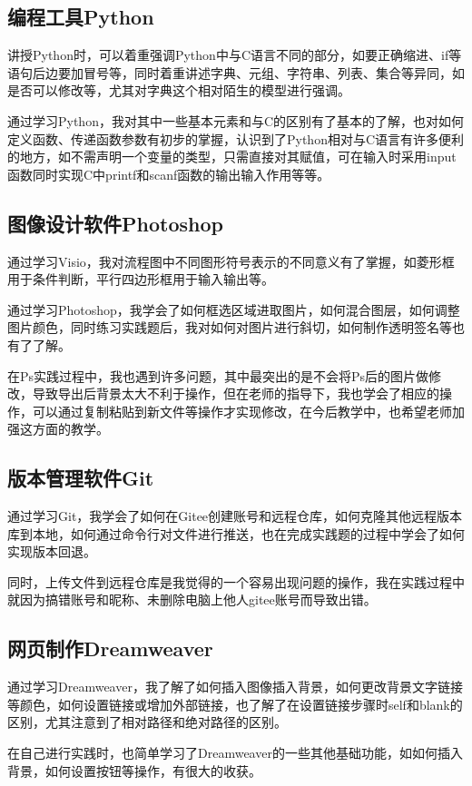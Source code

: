 \documentclass[supercite]{Experimental_Report}
\theoremstyle{definition}
\begin{document}
\subsection{编程工具Python}

讲授Python时，可以着重强调Python中与C语言不同的部分，如要正确缩进、if等语句后边要加冒号等，同时着重讲述字典、元组、字符串、列表、集合等异同，如是否可以修改等，尤其对字典这个相对陌生的模型进行强调。\par
通过学习Python，我对其中一些基本元素和与C的区别有了基本的了解，也对如何定义函数、传递函数参数有初步的掌握，认识到了Python相对与C语言有许多便利的地方，如不需声明一个变量的类型，只需直接对其赋值，可在输入时采用input函数同时实现C中printf和scanf函数的输出输入作用等等。
\newpage

\subsection{图像设计软件Photoshop}

通过学习Visio，我对流程图中不同图形符号表示的不同意义有了掌握，如菱形框用于条件判断，平行四边形框用于输入输出等。\par
通过学习Photoshop，我学会了如何框选区域进取图片，如何混合图层，如何调整图片颜色，同时练习实践题后，我对如何对图片进行斜切，如何制作透明签名等也有了了解。\par
在Ps实践过程中，我也遇到许多问题，其中最突出的是不会将Ps后的图片做修改，导致导出后背景太大不利于操作，但在老师的指导下，我也学会了相应的操作，可以通过复制粘贴到新文件等操作才实现修改，在今后教学中，也希望老师加强这方面的教学。


\subsection{版本管理软件Git}

通过学习Git，我学会了如何在Gitee创建账号和远程仓库，如何克隆其他远程版本库到本地，如何通过命令行对文件进行推送，也在完成实践题的过程中学会了如何实现版本回退。\par
同时，上传文件到远程仓库是我觉得的一个容易出现问题的操作，我在实践过程中就因为搞错账号和昵称、未删除电脑上他人gitee账号而导致出错。


\subsection{网页制作Dreamweaver}

通过学习Dreamweaver，我了解了如何插入图像插入背景，如何更改背景文字链接等颜色，如何设置链接或增加外部链接，也了解了在设置链接步骤时self和blank的区别，尤其注意到了相对路径和绝对路径的区别。\par
在自己进行实践时，也简单学习了Dreamweaver的一些其他基础功能，如如何插入背景，如何设置按钮等操作，有很大的收获。
\end{document}
